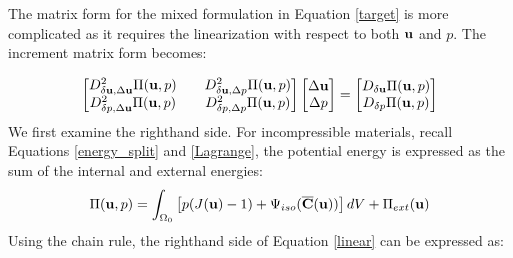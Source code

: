 The matrix form for the mixed formulation in Equation \ref{target} is more complicated as it requires the linearization with respect to both $\bold{u}$ and $p$. The increment matrix form becomes:

\begin{equation} \label{linear}
\begin{bmatrix}
D_{\delta\bold{u}, \Delta\bold{u}}^2 \Pi(\bold{u}, p)  && D_{\delta\bold{u}, \Delta{p}}^2 \Pi(\bold{u}, p)  \\ D_{\delta{p}, \Delta\bold{u}}^2 \Pi(\bold{u}, p)  && D_{\delta{p}, \Delta{p}}^2 \Pi(\bold{u}, p) 
\end{bmatrix}
\begin{bmatrix}
\Delta\bold{u} \\ \Delta{p}
\end{bmatrix}
= 
\begin{bmatrix}
D_{\delta\bold{u}}\Pi(\bold{u}, p) \\ D_{\delta{p}}\Pi(\bold{u}, p) 
\end{bmatrix}
\end{equation}
We first examine the righthand side. For incompressible materials, recall Equations \ref{energy_split} and \ref{Lagrange}, the potential energy is expressed as the sum of the internal and external energies:
\begin{equation} \label{split3}
\Pi(\bold{u}, p) = \int_{\Omega_0} \left[ p(J(\bold{u}) - 1) + \Psi_{iso}(\overline{\bold{C}}(\bold{u}))\right] dV + \Pi_{ext}(\bold{u})
\end{equation}
Using the chain rule, the righthand side of Equation \ref{linear} can be expressed as:

